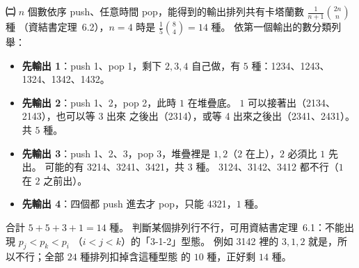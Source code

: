 \begin{pastsoln}
\textbf{㈡} $n$ 個數依序 push、任意時間 pop，能得到的輸出排列共有卡塔蘭數 $\frac{1}{n+1}\binom{2n}{n}$ 種
（資結書定理~6.2），$n = 4$ 時是 $\frac{1}{5}\binom{8}{4} = 14$ 種。 依第一個輸出的數分類列舉：
\begin{itemize}
\item \textbf{先輸出 1}：push 1、pop 1，剩下 $2, 3, 4$ 自己做，有 $5$ 種：1234、1243、1324、1342、1432。
\item \textbf{先輸出 2}：push 1、2，pop 2，此時 $1$ 在堆疊底。 $1$ 可以接著出（2134、2143），也可以等 3 出來
之後出（2314），或等 4 出來之後出（2341、2431）。 共 $5$ 種。
\item \textbf{先輸出 3}：push 1、2、3，pop 3，堆疊裡是 $1, 2$（$2$ 在上），$2$ 必須比 $1$ 先出。 可能的有
3214、3241、3421，共 $3$ 種。 3124、3142、3412 都不行（$1$ 在 $2$ 之前出）。
\item \textbf{先輸出 4}：四個都 push 進去才 pop，只能 4321，$1$ 種。
\end{itemize}
合計 $5 + 5 + 3 + 1 = 14$ 種。 判斷某個排列行不行，可用資結書定理~6.1：不能出現 $p_j < p_k < p_i$
（$i < j < k$）的「3-1-2」型態。 例如 3142 裡的 $3, 1, 2$ 就是，所以不行；全部 $24$ 種排列扣掉含這種型態
的 $10$ 種，正好剩 $14$ 種。
\end{pastsoln}
